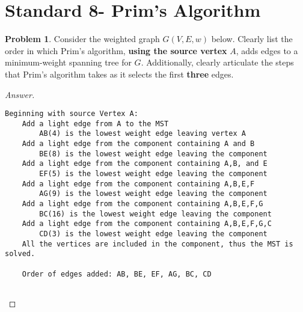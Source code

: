 \documentclass[11pt]{article}
\theoremstyle{definition}
\theoremstyle{definition}
\newtheorem{required}{Problem}
\theoremstyle{definition}
\begin{document}
\newpage
\section{Standard 8- Prim's Algorithm}

\begin{required}
Consider the weighted graph $G(V, E, w)$ below. Clearly list the order in which Prim's algorithm, \textbf{using the source vertex} $A$, adds edges to a minimum-weight spanning tree for $G$. Additionally, clearly articulate the steps that Prim's algorithm takes as it selects the first \textbf{three} edges.

\begin{center}
\end{center}
\end{required}


\begin{proof}[Answer]$ $
\begin{verbatim}
Beginning with source Vertex A:
    Add a light edge from A to the MST
        AB(4) is the lowest weight edge leaving vertex A
    Add a light edge from the component containing A and B
        BE(8) is the lowest weight edge leaving the component
    Add a light edge from the component containing A,B, and E
        EF(5) is the lowest weight edge leaving the component
    Add a light edge from the component containing A,B,E,F
        AG(9) is the lowest weight edge leaving the component
    Add a light edge from the component containing A,B,E,F,G
        BC(16) is the lowest weight edge leaving the component
    Add a light edge from the component containing A,B,E,F,G,C
        CD(3) is the lowest weight edge leaving the component
    All the vertices are included in the component, thus the MST is solved. 
    
    Order of edges added: AB, BE, EF, AG, BC, CD
    
\end{verbatim}
\end{proof}
\end{document}
